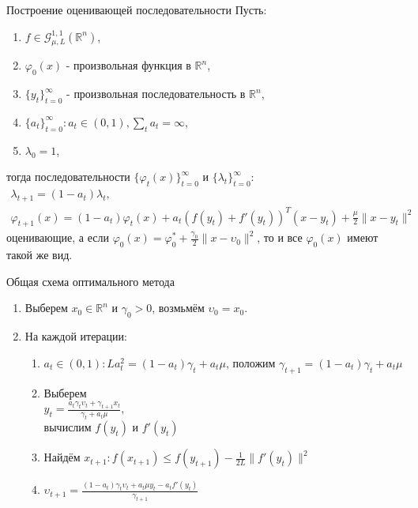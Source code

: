 \documentclass[14pt, fleqn, xcolor={dvipsnames, table}]{beamer}
\begin{document}
\begin{frame}{Построение оценивающей последовательности}
\small
Пусть:
\begin{enumerate}
  \item $f \in \mathcal{G}_{\mu, L}^{1,1}(\mathbb{R}^n)$,
  \item $\varphi_0(x)$ - произвольная функция в $\mathbb{R}^n$,
  \item $\{y_t\}_{t=0}^{\infty}$ - произвольная последовательность в $\mathbb{R}^n$,
  \item $\{a_t\}_{t=0}^{\infty}: a_t \in (0,1), \sum_ta_t = \infty$,
  \item $\lambda_0=1$,
\end{enumerate}
тогда последовательности $\{\varphi_t(x)\}_{t=0}^{\infty}$ и $\{\lambda_t\}_{t=0}^{\infty}$:
$$\begin{array}{l}
  \lambda_{t+1} = (1 - a_t)\lambda_t, \\
  \varphi_{t+1}(x) = (1 - a_t)\varphi_t(x) + a_t(f(y_t) + f'(y_t))^T(x-y_t) + \frac{\mu}{2}\|x - y_t\|^2
\end{array}$$
оценивающие, а если $\varphi_0(x) = \varphi_0^* + \frac{\gamma_0}{2}\|x - \upsilon_0\|^2$, то и все $\varphi_0(x)$ имеют такой же вид.
\end{frame}

\begin{frame}{Общая схема оптимального метода}
\begin{enumerate}
  \item Выберем $x_0 \in \mathbb{R}^n$ и $\gamma_0 > 0$, возмьмём $\upsilon_0=x_0$.
  \item  На каждой итерации:
  \begin{enumerate}
    \item $a_t \in (0,1): La_t^2 = (1-a_t)\gamma_t + a_t\mu$, положим $\gamma_{t+1} = (1-a_t)\gamma_t + a_t\mu$
    \item Выберем  \\ 
    $y_t = \frac{a_t\gamma_t\upsilon_t + \gamma_{t+1}x_t}{\gamma_t + a_t\mu}$, \\
     вычислим $f(y_t)$ и $f'(y_t)$
    \item Найдём $x_{t+1} : f(x_{t+1}) \le f(y_{t+1}) - \frac{1}{2L}\|f'(y_t)\|^2$
    \item $\upsilon_{t+1} = \frac{(1-a_t)\gamma_t\upsilon_t + a_t\mu y_t - a_t f'(y_t)}{\gamma_{t+1}}$
  \end{enumerate}
\end{enumerate}
\end{frame}
\end{document}
